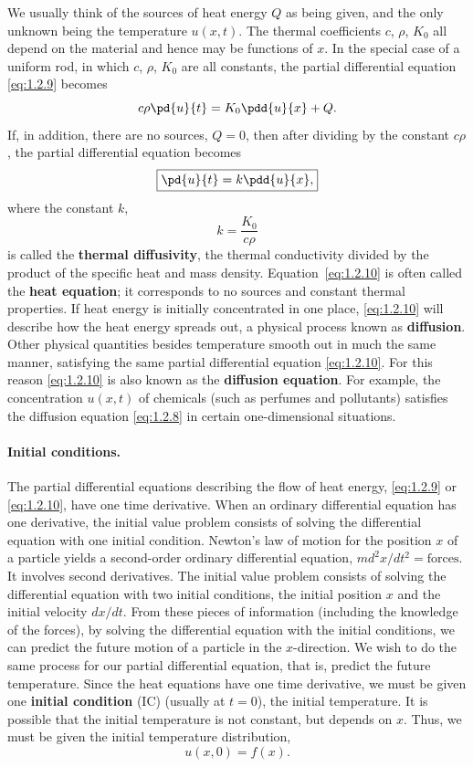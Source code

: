 We usually think of the sources of heat energy $Q$ as being given, and the only unknown being the temperature $u(x,t)$. The thermal coefficients $c$, $\rho$, $K_0$ all depend on the material and hence may be functions of $x$. In the special case of a uniform rod, in which $c$, $\rho$, $K_0$ are all constants, the partial differential equation \eqref{eq:1.2.9} becomes
\[
c\rho\pd{u}{t} = K_0 \pdd{u}{x} + Q.
\]
If, in addition, there are no sources, $Q = 0$, then after dividing by the constant $c\rho$, the partial differential equation becomes
\begin{equation}
\boxed{\pd{u}{t} = k\pdd{u}{x},}
\label{eq:1.2.10}
\end{equation}
where the constant $k$,
\[
k = \frac{K_0}{c\rho}
\]
is called the \textbf{thermal diffusivity}, the thermal conductivity divided by the product of the specific heat and mass density. Equation~\eqref{eq:1.2.10} is often called the \textbf{heat equation}; it corresponds to no sources and constant thermal properties. If heat energy is initially concentrated in one place, \eqref{eq:1.2.10} will describe how the heat energy spreads out, a physical process known as \textbf{diffusion}. Other physical quantities besides temperature smooth out in much the same manner, satisfying the same partial differential equation \eqref{eq:1.2.10}. For this reason \eqref{eq:1.2.10} is also known as the \textbf{diffusion equation}. For example, the concentration $u(x,t)$ of chemicals (such as perfumes and pollutants) satisfies the diffusion equation \eqref{eq:1.2.8} in certain one-dimensional situations.

\paragraph{Initial conditions.}
The partial differential equations describing the flow of heat energy, \eqref{eq:1.2.9} or \eqref{eq:1.2.10}, have one time derivative. When an ordinary differential equation has one derivative, the initial value problem consists of solving the differential equation with one initial condition. Newton's law of motion for the position $x$ of a particle yields a second-order ordinary differential equation, $md^2x/dt^2 = \text{forces}$. It involves second derivatives. The initial value problem consists of solving the differential equation with two initial conditions, the initial position $x$ and the initial velocity $dx/dt$. From these pieces of information (including the knowledge of the forces), by solving the differential equation with the initial conditions, we can predict the future motion of a particle in the $x$-direction. We wish to do the same process for our partial differential equation, that is, predict the future temperature. Since the heat equations have one time derivative, we must be given one \textbf{initial condition} (IC) (usually at $t = 0$), the initial temperature. It is possible that the initial temperature is not constant, but depends on $x$. Thus, we must be given the initial temperature distribution,
\[
u(x,0) = f(x).
\]

